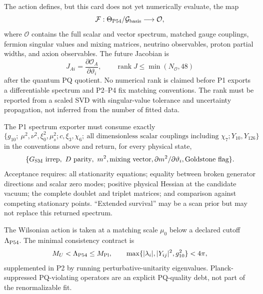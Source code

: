 \documentclass[11pt]{article}
\newcommand{\SM}{G_{\rm SM}}
\newcommand{\ThetaP}{\Theta_{\rm P54}}
\newcommand{\OO}{\mathcal O}
\begin{document}
The action defines, but this card does not yet numerically evaluate, the map
\begin{equation}
 \mathcal F:\ThetaP/\mathcal G_{\rm basis}\longrightarrow\OO,
 \label{eq:observablemap}
\end{equation}
where $\OO$ contains the full scalar and vector spectrum, matched gauge
couplings, fermion singular values and mixing matrices, neutrino observables,
proton partial widths, and axion observables.  The future Jacobian is
\begin{equation}
 J_{Ai}=\frac{\partial\OO_A}{\partial\vartheta_i},\qquad
 \operatorname{rank}J\le\min(N_{\OO},48)
 \label{eq:jacobian}
\end{equation}
after the quantum PQ quotient.  No numerical rank is claimed before P1
exports a differentiable spectrum and P2--P4 fix matching conventions.
The rank must be reported from a scaled SVD with singular-value tolerance and
uncertainty propagation, not inferred from the number of fitted data.

The P1 spectrum exporter must consume exactly
\begin{equation}
 \{g_{10};\ \mu^2,\nu^2,\xi_0^2,\mu_s^2;
 c,\xi_3,\chi_6;\ \text{all dimensionless scalar couplings including }\chi_7;
 Y_{10},Y_{126}\}
\end{equation}
in the conventions above and return, for every physical state,
\begin{equation}
 \{\SM\text{ irrep},\ D\text{ parity},\ m^2,\text{mixing vector},
 \partial m^2/\partial\vartheta_i,\text{Goldstone flag}\}.
\end{equation}
Acceptance requires: all stationarity equations; equality between broken
generator directions and scalar zero modes; positive physical Hessian at the
candidate vacuum; the complete doublet and triplet matrices; and comparison
against competing stationary points.  ``Extended survival'' may be a scan
prior but may not replace this returned spectrum.

The Wilsonian action is taken at a matching scale $\mu_0$ below a declared
cutoff $\Lambda_{\rm P54}$.  The minimal consistency contract is
\begin{equation}
 M_U<\Lambda_{\rm P54}\le M_{\rm Pl},\qquad
 \max\{|\lambda_i|,|Y_{ij}|^2,g_{10}^2\}<4\pi,
 \label{eq:cutoff}
\end{equation}
supplemented in P2 by running perturbative-unitarity eigenvalues.  Planck-
suppressed PQ-violating operators are an explicit PQ-quality debt, not part
of the renormalizable fit.
\end{document}
